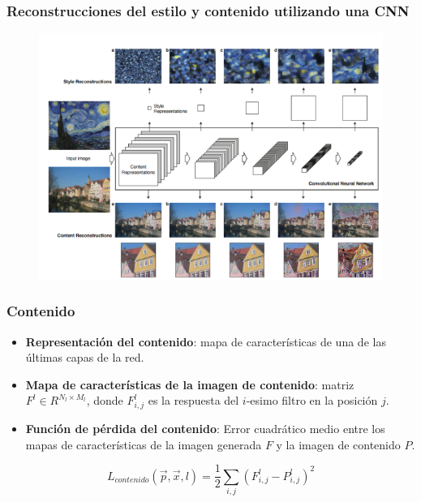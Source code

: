 \documentclass[10pt,center]{beamer}
\begin{document}
\begin{frame}
  \frametitle{Reconstrucciones del estilo y contenido utilizando una CNN}
   \begin{figure}[h]
    \begin{center}
     \includegraphics[width=\textwidth]{./img/gatys_1.png}
    \end{center}
  \end{figure} 
\end{frame}


\begin{frame}
 \frametitle{Contenido}
  \begin{itemize}
   \item \textbf{Representación del contenido}: mapa de características de una de las últimas capas de la red.
   \item \textbf{Mapa de características de la imagen de contenido}: matriz $F^l \in R^{N_l \times M_l}$, donde $F_{i,j}^l$ es la respuesta del $i$-esimo filtro en la posición $j$.
   \item \textbf{Función de pérdida del contenido}: Error cuadrático medio entre los mapas de características de la imagen generada $F$ y la imagen de contenido $P$.
  \end{itemize}
  \begin{equation}
    L_{contenido}(\overrightarrow{p},\overrightarrow{x}, l) = \frac{1}{2} \sum_{i,j} (F_{i,j}^l - P_{i,j}^l)^2
  \end{equation}
\end{frame}
\end{document}
